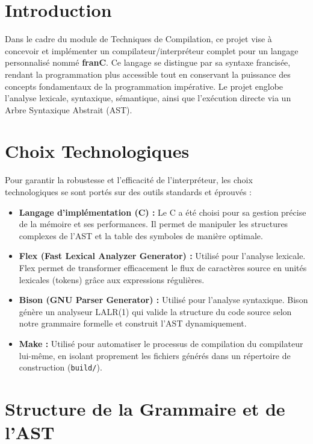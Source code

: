 \documentclass[pfe ,titlesmallcaps]{isi_report}
\begin{document}


\tableofcontents
\newpage

\chapter{Introduction}
Dans le cadre du module de Techniques de Compilation, ce projet vise à concevoir et implémenter un compilateur/interpréteur complet pour un langage personnalisé nommé \textbf{franC}. Ce langage se distingue par sa syntaxe francisée, rendant la programmation plus accessible tout en conservant la puissance des concepts fondamentaux de la programmation impérative. Le projet englobe l'analyse lexicale, syntaxique, sémantique, ainsi que l'exécution directe via un Arbre Syntaxique Abstrait (AST).

\chapter{Choix Technologiques}
Pour garantir la robustesse et l'efficacité de l'interpréteur, les choix technologiques se sont portés sur des outils standards et éprouvés :
\begin{itemize}
	\item \textbf{Langage d'implémentation (C) :} Le C a été choisi pour sa gestion précise de la mémoire et ses performances. Il permet de manipuler les structures complexes de l'AST et la table des symboles de manière optimale.
	\item \textbf{Flex (Fast Lexical Analyzer Generator) :} Utilisé pour l'analyse lexicale. Flex permet de transformer efficacement le flux de caractères source en unités lexicales (tokens) grâce aux expressions régulières.
	\item \textbf{Bison (GNU Parser Generator) :} Utilisé pour l'analyse syntaxique. Bison génère un analyseur LALR(1) qui valide la structure du code source selon notre grammaire formelle et construit l'AST dynamiquement.
	\item \textbf{Make :} Utilisé pour automatiser le processus de compilation du compilateur lui-même, en isolant proprement les fichiers générés dans un répertoire de construction (\texttt{build/}).
\end{itemize}

\chapter{Structure de la Grammaire et de l'AST}
\end{document}
